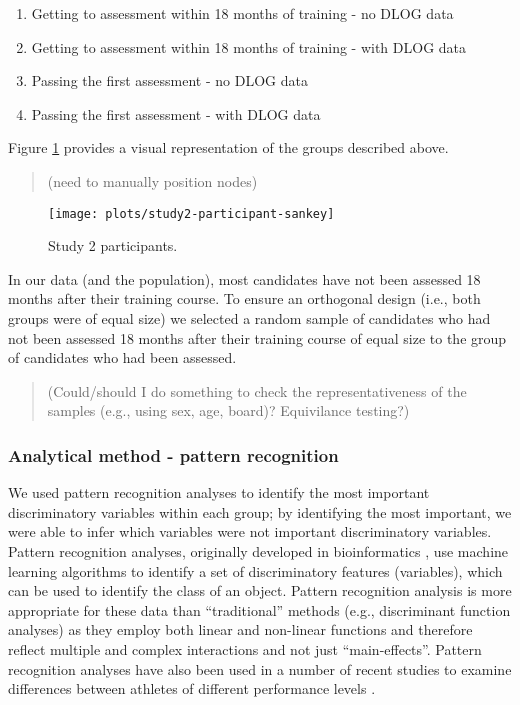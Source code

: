 \documentclass[a4paper,]{book}
\providecommand{\tightlist}{%
  \setlength{\itemsep}{0pt}\setlength{\parskip}{0pt}}
\begin{document}
\begin{enumerate}
\def\labelenumi{\arabic{enumi})}
\tightlist
\item
  Getting to assessment within 18 months of training - no DLOG data
\item
  Getting to assessment within 18 months of training - with DLOG data
\item
  Passing the first assessment - no DLOG data
\item
  Passing the first assessment - with DLOG data
\end{enumerate}

Figure \ref{fig:study2-participant-sankey} provides a visual representation of the groups described above.

\begin{quote}
(need to manually position nodes)
\end{quote}

\begin{figure}
\texttt{[image: plots/study2-participant-sankey]} \caption{Study 2 participants.}\label{fig:study2-participant-sankey}
\end{figure}

In our data (and the population), most candidates have not been assessed 18 months after their training course. To ensure an orthogonal design (i.e., both groups were of equal size) we selected a random sample of candidates who had not been assessed 18 months after their training course of equal size to the group of candidates who had been assessed.

\begin{quote}
(Could/should I do something to check the representativeness of the samples (e.g., using sex, age, board)? Equivilance testing?)
\end{quote}

\hypertarget{analytical-method---pattern-recognition}{%
\subsubsection{Analytical method - pattern recognition}\label{analytical-method---pattern-recognition}}

We used pattern recognition analyses to identify the most important discriminatory variables within each group; by identifying the most important, we were able to infer which variables were not important discriminatory variables. Pattern recognition analyses, originally developed in bioinformatics \citep{Duda2000}, use machine learning algorithms to identify a set of discriminatory features (variables), which can be used to identify the class of an object. Pattern recognition analysis is more appropriate for these data than ``traditional'' methods (e.g., discriminant function analyses) as they employ both linear and non-linear functions and therefore reflect multiple and complex interactions and not just ``main-effects''. Pattern recognition analyses have also been used in a number of recent studies to examine differences between athletes of different performance levels \citep[e.g.,][]{Gullich2019, Jones2019a}.
\end{document}
